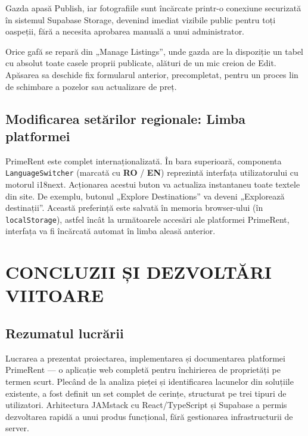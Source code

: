 \documentclass[12pt,a4paper,oneside]{report}
\begin{document}
Gazda apasă Publish, iar fotografiile sunt încărcate printr-o conexiune securizată în sistemul Supabase Storage, devenind imediat vizibile public pentru toți oaspeții, fără a necesita aprobarea manuală a unui administrator.

Orice gafă se repară din „Manage Listings'', unde gazda are la dispoziție un tabel cu absolut toate casele proprii publicate, alături de un mic creion de Edit. Apăsarea sa deschide fix formularul anterior, precompletat, pentru un proces lin de schimbare a pozelor sau actualizare de preț.

\section{Modificarea setărilor regionale: Limba platformei}

PrimeRent este complet internaționalizată. În bara superioară, componenta \texttt{LanguageSwitcher} (marcată cu \textbf{RO} / \textbf{EN}) reprezintă interfața utilizatorului cu motorul i18next. 
Acționarea acestui buton va actualiza instantaneu toate textele din site. De exemplu, butonul „Explore Destinations'' va deveni „Explorează destinații''. Această preferință este salvată în memoria browser-ului (în \texttt{localStorage}), astfel încât la următoarele accesări ale platformei PrimeRent, interfața va fi încărcată automat în limba aleasă anterior.


\chapter{CONCLUZII ȘI DEZVOLTĂRI VIITOARE}

\section{Rezumatul lucrării}

Lucrarea a prezentat proiectarea, implementarea și documentarea platformei PrimeRent — o aplicație web completă pentru închirierea de proprietăți pe termen scurt. Plecând de la analiza pieței și identificarea lacunelor din soluțiile existente, a fost definit un set complet de cerințe, structurat pe trei tipuri de utilizatori. Arhitectura JAMstack cu React/TypeScript și Supabase a permis dezvoltarea rapidă a unui produs funcțional, fără gestionarea infrastructurii de server.
\end{document}
